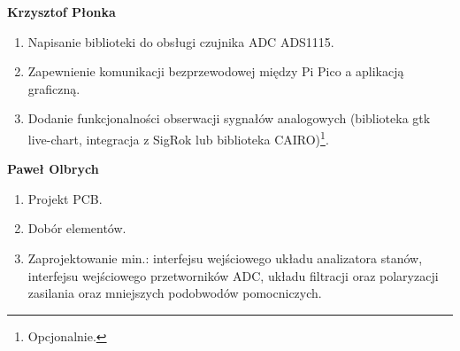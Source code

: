     \textbf{Krzysztof Płonka}
    \begin{enumerate}
        \item Napisanie biblioteki do obsługi czujnika ADC ADS1115.
        \item Zapewnienie komunikacji bezprzewodowej między Pi Pico a aplikacją graficzną.
        \item Dodanie funkcjonalności obserwacji sygnałów analogowych
        (biblioteka gtk live-chart, integracja z SigRok lub biblioteka CAIRO)\footnote{Opcjonalnie.}.\\ 
    \end{enumerate}

    \textbf{Paweł Olbrych}
    \begin{enumerate}
        \item Projekt PCB.
        \item Dobór elementów.
        \item Zaprojektowanie min.: interfejsu wejściowego układu analizatora stanów,
        interfejsu wejściowego przetworników ADC, układu filtracji oraz polaryzacji zasilania oraz
        mniejszych podobwodów pomocniczych. 
    \end{enumerate}
    
